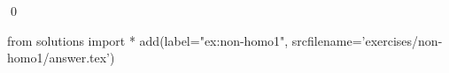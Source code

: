 
\begin{ex} 
  \label{ex:non-homo1}
  
  \qed
\end{ex} 
\begin{python0}
from solutions import *
add(label="ex:non-homo1",
    srcfilename='exercises/non-homo1/answer.tex') 
\end{python0}
